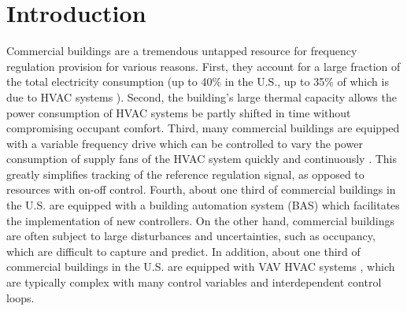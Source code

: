 %



\section{Introduction}\label{sec:introduction}

%

Commercial buildings are a tremendous untapped resource for frequency regulation provision for various reasons.
First, they account for a large fraction of the total electricity consumption (up to 40\% in the U.S., up to 35\% of which is due to HVAC systems \cite{USenergy:2017}). 
Second, the building's large thermal capacity allows the power consumption of HVAC systems be partly shifted in time without compromising occupant comfort. 
Third, many commercial buildings are equipped with a variable frequency drive which can be controlled to vary the power consumption of supply fans of the HVAC system quickly and continuously \cite{Hao:2012demandresponse}. This greatly simplifies tracking of the reference regulation signal, as opposed to resources with on-off control.
Fourth, about one third of commercial buildings in the U.S. are equipped with a building automation system (BAS) \cite{Braun:2012} which facilitates the implementation of new controllers.
On the other hand, commercial buildings are often subject to large disturbances and uncertainties, such as occupancy, which are difficult to capture and predict. %
In addition, about one third of commercial buildings in the U.S. are equipped with VAV HVAC systems \cite{Hao:2012demandresponse}, which are typically complex with many control variables and interdependent control loops.


